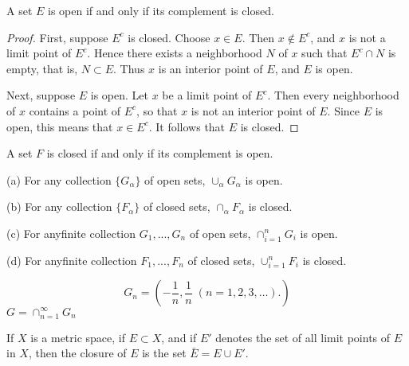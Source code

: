 \begin{thm}
    A set $E$ is open if and only if its complement is closed.
\end{thm}

\begin{proof}
    First, suppose $E^c$ is closed. Choose $x \in E$. Then $x \not\in E^c$, and $x$ is not a limit point of $E^c$. Hence there exists a neighborhood $N$ of $x$ such that $E^c \cap N$ is empty, that is, $N \subset E$. Thus $x$ is an interior point of $E$, and $E$ is open.
    
    Next, suppose $E$ is open. Let $x$ be a limit point of $E^c$. Then every neighborhood of $x$ contains a point of $E^c$, so that $x$ is not an interior point of $E$. Since $E$ is open, this means that $x \in E^c$. It follows that $E$ is closed.
\end{proof}

\begin{myCorollary}
    A set $F$ is closed if and only if its complement is open.
\end{myCorollary}


\begin{thm}
    (a) For any collection $\{G_\alpha\}$ of open sets,  $\cup_\alpha G_\alpha$ is open.

    (b) For any collection $\{F_\alpha\}$ of closed sets, $\cap_\alpha F_\alpha$ is closed.

    (c) For anyfinite collection $G_1, ..., G_n$ of open sets, $\cap_{i=1}^n G_i$ is open.

    (d) For anyfinite collection $F_1, ..., F_n$ of closed sets, $\cup_{i=1}^n F_i$ is closed.
\end{thm}

\begin{myExample}
    \begin{equation*}
        G_n = \left(-\frac{1}{n}, \frac{1}{n} \; (n=1,2,3,\dots). \right)
    \end{equation*}
    $G = \cap_{n=1}^\infty G_n$
\end{myExample}

\begin{myDefinition}
    If $X$ is a metric space, if $E \subset X$, and if $E'$ denotes the set of all limit points of $E$ in $X$, then the closure of $E$ is the set $\bar{E}=E \cup E'$.
\end{myDefinition}

